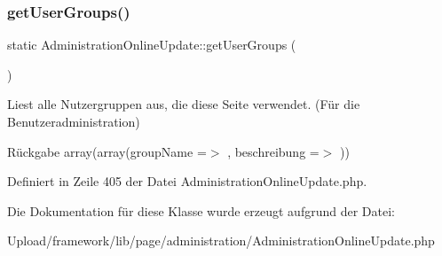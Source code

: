 \mbox{\label{class_administration_online_update_a3dbe3b98420644968d3548bd615edccd}} 
\subsubsection{\texorpdfstring{get\+User\+Groups()}{getUserGroups()}}
{\footnotesize\ttfamily static Administration\+Online\+Update\+::get\+User\+Groups (\begin{DoxyParamCaption}{ }\end{DoxyParamCaption})\hspace{0.3cm}{\ttfamily [static]}}

Liest alle Nutzergruppen aus, die diese Seite verwendet. (Für die Benutzeradministration) \begin{DoxyReturn}{Rückgabe}
array(array(\textquotesingle{}group\+Name\textquotesingle{} =$>$ \textquotesingle{}\textquotesingle{}, \textquotesingle{}beschreibung\textquotesingle{} =$>$ \textquotesingle{}\textquotesingle{})) 
\end{DoxyReturn}


Definiert in Zeile 405 der Datei Administration\+Online\+Update.\+php.



Die Dokumentation für diese Klasse wurde erzeugt aufgrund der Datei\+:\begin{DoxyCompactItemize}
\item 
Upload/framework/lib/page/administration/Administration\+Online\+Update.\+php\end{DoxyCompactItemize}
